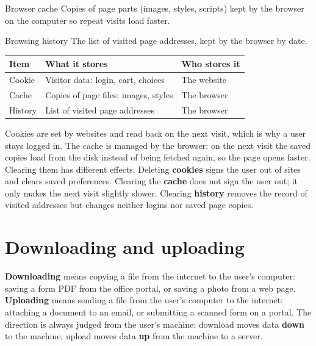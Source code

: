 \begin{definitionbox}{Browser cache}
Copies of page parts (images, styles, scripts) kept by the browser on the
computer so repeat visits load faster.
\end{definitionbox}

\begin{definitionbox}{Browsing history}
The list of visited page addresses, kept by the browser by date.
\end{definitionbox}

\begin{center}
\begin{tabular}{p{}p{}p{}}
\toprule
\textbf{Item} & \textbf{What it stores} & \textbf{Who stores it} \\
\midrule
Cookie & Visitor data: login, cart, choices & The website \\
Cache & Copies of page files: images, styles & The browser \\
History & List of visited page addresses & The browser \\
\bottomrule
\end{tabular}
\end{center}

Cookies are set by websites and read back on the next visit, which is why a
user stays logged in. The cache is managed by the browser: on the next visit
the saved copies load from the disk instead of being fetched again, so the
page opens faster. Clearing them has different effects. Deleting
\textbf{cookies} signs the user out of sites and clears saved preferences.
Clearing the \textbf{cache} does not sign the user out; it only makes the
next visit slightly slower. Clearing \textbf{history} removes the record of
visited addresses but changes neither logins nor saved page copies.

\section{Downloading and uploading}
\textbf{Downloading} means copying a file from the internet to the user's
computer: saving a form PDF from the office portal, or saving a photo from a
web page. \textbf{Uploading} means sending a file from the user's computer to
the internet: attaching a document to an email, or submitting a scanned form
on a portal. The direction is always judged from the user's machine: download
moves data \textbf{down} to the machine, upload moves data \textbf{up} from
the machine to a server.


